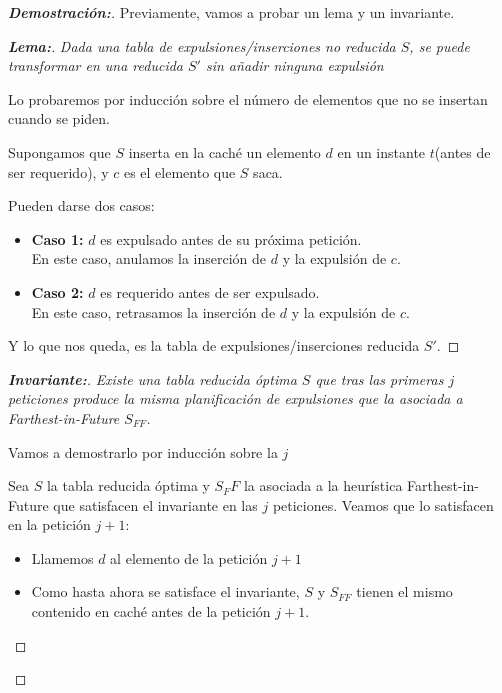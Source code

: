 \documentclass[a4paper, 11pt]{article} %
\begin{document}
  \begin{proof}[\textbf{Demostración:}]
  	Previamente, vamos a probar un lema y un invariante.
  
	  \begin{proof}[\textbf{Lema:}]
	    \textit{
	      Dada una tabla de expulsiones/inserciones no reducida $S$, se puede transformar en una reducida $S'$ sin añadir ninguna expulsión  
	    }
	    
	    Lo probaremos por inducción sobre el número de elementos que no se insertan cuando se piden.
	    
	    Supongamos que $S$ inserta en la caché un elemento $d$ en un instante $t$(antes de ser requerido), y $c$
	    es el elemento que $S$ saca.
	    
	    Pueden darse dos casos:
	    \begin{itemize}
	      \item \textbf{Caso 1: } $d$ es expulsado antes de su próxima petición.\\
	      En este caso, anulamos la inserción de $d$ y la expulsión de $c$.
	      \item \textbf{Caso 2: } $d$ es requerido antes de ser expulsado. \\
	      En este caso, retrasamos la inserción de $d$ y la expulsión de $c$.
	    \end{itemize}
	    
	    Y lo que nos queda, es la tabla de expulsiones/inserciones reducida $S'$.
	    
	  \end{proof}
	
	\begin{proof}[\textbf{Invariante:}]
	  \textit{
	    Existe una tabla reducida óptima $S$ que tras las primeras $j$ peticiones produce la misma planificación de expulsiones que la asociada a Farthest-in-Future $S_{FF}$.
	  }
	  
	  Vamos a demostrarlo por inducción sobre la $j$
	  
	  Sea $S$ la tabla reducida óptima y $S_FF$ la asociada a la heurística Farthest-in-Future que satisfacen el invariante en las $j$ peticiones.
	  Veamos que lo satisfacen en la petición $j+1$:
	  
	  \begin{itemize}
	  	\item Llamemos $d$ al elemento de la petición $j+1$
	  	\item Como hasta ahora se satisface el invariante, $S$ y $S_{FF}$ tienen el mismo contenido en caché antes de la petición $j+1$.
	  

\end{itemize}
\end{proof}
\end{proof}
\end{document}
